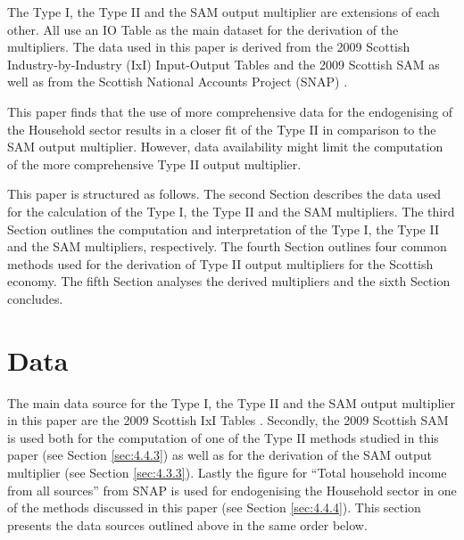 \begin{doublespacing}
\bigskip

The Type I, the Type II and the SAM output multiplier are extensions of each other. All use an IO Table as the main dataset for the derivation of the multipliers. The data used in this paper is derived from the 2009 Scottish Industry-by-Industry (IxI) Input-Output Tables and the 2009 Scottish SAM  as well as from the Scottish National Accounts Project (SNAP) \cite{ScotGov2013c}.

\bigskip

This paper finds that the use of more comprehensive data for the endogenising of the Household sector results in a closer fit of the Type II in comparison to the SAM output multiplier. However, data availability might limit the computation of the more comprehensive Type II output multiplier.

\bigskip

This paper is structured as follows. The second Section describes the data used for the calculation of the Type I, the Type II and the SAM multipliers. The third Section outlines the computation and interpretation of the Type I, the Type II and the SAM multipliers, respectively. The fourth Section outlines four common methods used for the derivation of Type II output multipliers for the Scottish economy. The fifth Section analyses the derived multipliers and the sixth Section concludes.

\newpage


\section{Data}
\label{sec:4.2}

The main data source for the Type I, the Type II and the SAM output multiplier in this paper are the 2009 Scottish IxI Tables \cite{ScottishGovernment2013a}. Secondly, the 2009 Scottish SAM is used both for the computation of one of the Type II methods studied in this paper (see Section \ref{sec:4.4.3}) as well as for the derivation of the SAM output multiplier (see Section \ref{sec:4.3.3}). Lastly the figure for ``Total household income from all sources'' from SNAP is used for endogenising the Household sector in one of the methods discussed in this paper (see Section \ref{sec:4.4.4}). This section presents the data sources outlined above in the same order below.


\end{doublespacing}
